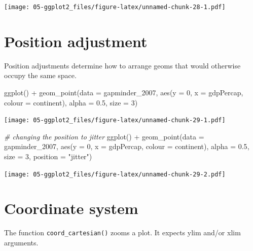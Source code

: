 \documentclass[
]{book}
\newenvironment{Shaded}{\begin{snugshade}}{\end{snugshade}}
\newcommand{\AttributeTok}[1]{\textcolor[rgb]{0.77,0.63,0.00}{#1}}
\newcommand{\CommentTok}[1]{\textcolor[rgb]{0.56,0.35,0.01}{\textit{#1}}}
\newcommand{\DecValTok}[1]{\textcolor[rgb]{0.00,0.00,0.81}{#1}}
\newcommand{\FloatTok}[1]{\textcolor[rgb]{0.00,0.00,0.81}{#1}}
\newcommand{\FunctionTok}[1]{\textcolor[rgb]{0.00,0.00,0.00}{#1}}
\newcommand{\NormalTok}[1]{#1}
\newcommand{\SpecialCharTok}[1]{\textcolor[rgb]{0.00,0.00,0.00}{#1}}
\newcommand{\StringTok}[1]{\textcolor[rgb]{0.31,0.60,0.02}{#1}}
\begin{document}
\texttt{[image: 05-ggplot2\_files/figure-latex/unnamed-chunk-28-1.pdf]}

\hypertarget{position-adjustment}{%
\section{Position adjustment}\label{position-adjustment}}

Position adjustments determine how to arrange geoms that would otherwise occupy the same space.

\begin{Shaded}
\begin{Highlighting}[]
\FunctionTok{ggplot}\NormalTok{() }\SpecialCharTok{+} 
  \FunctionTok{geom\_point}\NormalTok{(}\AttributeTok{data =}\NormalTok{ gapminder\_2007, }\FunctionTok{aes}\NormalTok{(}\AttributeTok{y =} \DecValTok{0}\NormalTok{, }\AttributeTok{x =}\NormalTok{ gdpPercap, }\AttributeTok{colour =}\NormalTok{ continent), }
             \AttributeTok{alpha =} \FloatTok{0.5}\NormalTok{, }\AttributeTok{size =} \DecValTok{3}\NormalTok{)}
\end{Highlighting}
\end{Shaded}

\texttt{[image: 05-ggplot2\_files/figure-latex/unnamed-chunk-29-1.pdf]}

\begin{Shaded}
\begin{Highlighting}[]
\CommentTok{\# changing the position to jitter}
\FunctionTok{ggplot}\NormalTok{() }\SpecialCharTok{+} 
  \FunctionTok{geom\_point}\NormalTok{(}\AttributeTok{data =}\NormalTok{ gapminder\_2007, }\FunctionTok{aes}\NormalTok{(}\AttributeTok{y =} \DecValTok{0}\NormalTok{, }\AttributeTok{x =}\NormalTok{ gdpPercap, }\AttributeTok{colour =}\NormalTok{ continent), }
             \AttributeTok{alpha =} \FloatTok{0.5}\NormalTok{, }\AttributeTok{size =} \DecValTok{3}\NormalTok{, }\AttributeTok{position =} \StringTok{"jitter"}\NormalTok{)}
\end{Highlighting}
\end{Shaded}

\texttt{[image: 05-ggplot2\_files/figure-latex/unnamed-chunk-29-2.pdf]}

\hypertarget{coordinate-system}{%
\section{Coordinate system}\label{coordinate-system}}

The function \texttt{coord\_cartesian()} zooms a plot. It expects ylim and/or xlim arguments.
\end{document}
